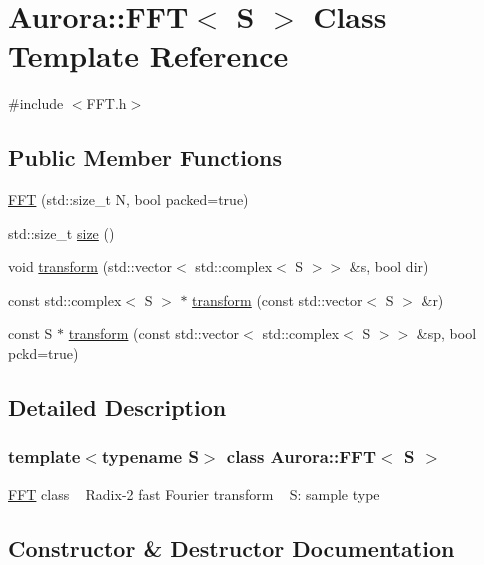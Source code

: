 \hypertarget{class_aurora_1_1_f_f_t}{}\section{Aurora\+:\+:F\+FT$<$ S $>$ Class Template Reference}
\label{class_aurora_1_1_f_f_t}


{\ttfamily \#include $<$F\+F\+T.\+h$>$}

\subsection*{Public Member Functions}
\begin{DoxyCompactItemize}
\item 
\hyperlink{class_aurora_1_1_f_f_t_ab98366f22f4fde5a1b0e32445eedcf3c}{F\+FT} (std\+::size\+\_\+t N, bool packed=true)
\item 
std\+::size\+\_\+t \hyperlink{class_aurora_1_1_f_f_t_ad0149c60672d3f4e64850dde22f5b163}{size} ()
\item 
void \hyperlink{class_aurora_1_1_f_f_t_a8325de64c8b9f208ed0bc8db3f74e4c7}{transform} (std\+::vector$<$ std\+::complex$<$ S $>$$>$ \&s, bool dir)
\item 
const std\+::complex$<$ S $>$ $\ast$ \hyperlink{class_aurora_1_1_f_f_t_a51ed1e25953c12b7f4cc145d19ee5cd8}{transform} (const std\+::vector$<$ S $>$ \&r)
\item 
const S $\ast$ \hyperlink{class_aurora_1_1_f_f_t_aa0912d8abdeb15ff84d82a5cc59cb150}{transform} (const std\+::vector$<$ std\+::complex$<$ S $>$$>$ \&sp, bool pckd=true)
\end{DoxyCompactItemize}


\subsection{Detailed Description}
\subsubsection*{template$<$typename S$>$\newline
class Aurora\+::\+F\+F\+T$<$ S $>$}

\hyperlink{class_aurora_1_1_f_f_t}{F\+FT} class ~\newline
Radix-\/2 fast Fourier transform ~\newline
S\+: sample type 

\subsection{Constructor \& Destructor Documentation}
\mbox{\label{class_aurora_1_1_f_f_t_ab98366f22f4fde5a1b0e32445eedcf3c}} 
